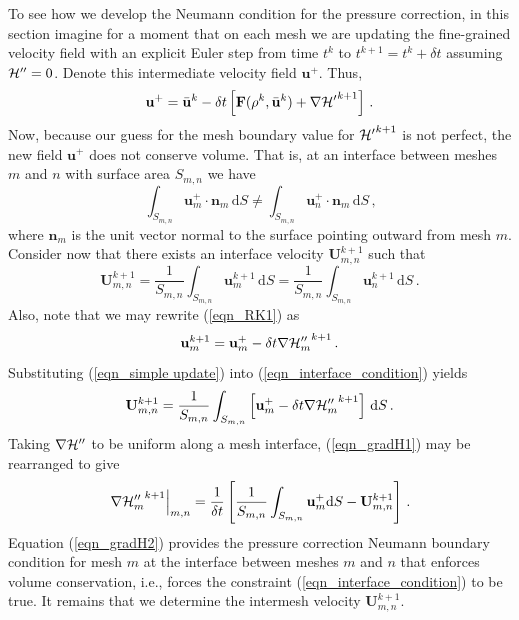 \documentclass[11pt]{book}
\begin{document}
To see how we develop the Neumann condition for the pressure correction, in this section imagine for a moment that on each mesh we are updating the fine-grained velocity field with an explicit Euler step from time $t^k$ to $t^{k+1} = t^k + \delta t$ assuming ${\cal H}'' = 0$.  Denote this intermediate velocity field $\mathbf{u}^+$.  Thus,
\begin{equation}
\label{eqn_intermediate_vel}
\mathbf{u}^+ = \bar{\mathbf{u}}^k - \delta t \left[ \mathbf{F}(\rho^k,\bar{\mathbf{u}}^k) + \nabla{{\cal H}'}^{k+1} \right] \,\mbox{.}
\end{equation}
Now, because our guess for the mesh boundary value for ${{\cal H}'}^{k+1}$ is not perfect, the new field $\mathbf{u}^+$ does not conserve volume.  That is, at an interface between meshes $m$ and $n$ with surface area $S_{m,n}$ we have
\begin{equation}
\label{eqn_novolcons}
\int_{S_{m,n}} \mathbf{u}^+_{m} \cdot\mathbf{n}_m\,\mbox{d}S \ne \int_{S_{m,n}} \mathbf{u}^+_{n} \cdot\mathbf{n}_m\,\mbox{d}S \,\mbox{,}
\end{equation}
where $\mathbf{n}_m$ is the unit vector normal to the surface pointing outward from mesh $m$. Consider now that there exists an interface velocity $\mathbf{U}^{k+1}_{m,n}$ such that
\begin{equation}
\label{eqn_interface_condition}
\mathbf{U}^{k+1}_{m,n} = \frac{1}{S_{m,n}}\int_{S_{m,n}} \mathbf{u}^{k+1}_{m} \,\mbox{d} S = \frac{1}{S_{m,n}}\int_{S_{m,n}} \mathbf{u}^{k+1}_{n} \,\mbox{d} S \,\mbox{.}
\end{equation}
Also, note that we may rewrite (\ref{eqn_RK1}) as
\begin{equation}
\label{eqn_simple update}
\mathbf{u}_{m}^{k+1} = \mathbf{u}_{m}^+ - \delta t \nabla {{\cal H}_m''}^{k+1} \,\mbox{.}
\end{equation}
Substituting (\ref{eqn_simple update}) into (\ref{eqn_interface_condition}) yields
\begin{equation}
\label{eqn_gradH1}
\mathbf{U}^{k+1}_{m,n} = \frac{1}{S_{m,n}}\int_{S_{m,n}} \left[\mathbf{u}_{m}^+ - \delta t \nabla {{\cal H}_m''}^{k+1} \right]\,\mbox{d} S \,\mbox{.}
\end{equation}
Taking $\nabla {{\cal H}''}$ to be uniform along a mesh interface, (\ref{eqn_gradH1}) may be rearranged to give
\begin{equation}
\label{eqn_gradH2}
\left.\nabla {{\cal H}_m''}^{k+1}\right|_{m,n} = \frac{1}{\delta t} \left[ \frac{1}{S_{m,n}} \int_{S_{m,n}} \mathbf{u}_{m}^+ \mbox{d} S - \mathbf{U}^{k+1}_{m,n} \right] \,\mbox{.}
\end{equation}
Equation (\ref{eqn_gradH2}) provides the pressure correction Neumann boundary condition for mesh $m$ at the interface between meshes $m$ and $n$ that enforces volume conservation, i.e., forces the constraint (\ref{eqn_interface_condition}) to be true.  It remains that we determine the intermesh velocity $\mathbf{U}^{k+1}_{m,n}$.
\end{document}
